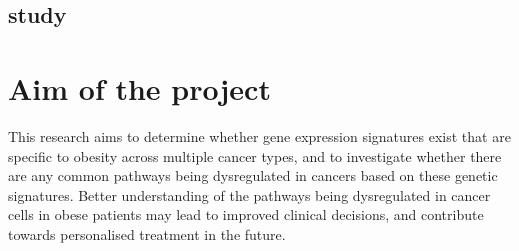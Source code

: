 
\subsection{\citep{Gatza2011} study}
\label{sub:gatza_study}





\section{Aim of the project}
\label{sec:aim}

This research aims to determine whether gene expression signatures exist  that are specific to obesity across multiple cancer types, and to investigate whether there are any common pathways being dysregulated in cancers based on these genetic signatures.
Better understanding of the pathways being dysregulated in cancer cells in obese patients may lead to improved clinical decisions, and contribute towards personalised treatment in the future.

